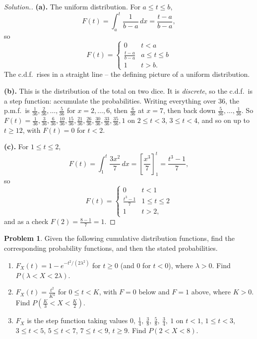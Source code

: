 \documentclass[12pt,a4paper]{report}
\theoremstyle{definition}
\theoremstyle{plain}
\theoremstyle{definition}
\newtheorem{problemx}{Problem}[section]
\newenvironment{problem}{\begin{problemx}}{\end{problemx}}
\newenvironment{solution}
  {\renewcommand{\qedsymbol}{}\begin{proof}[\textit{Solution}.]}
  {\end{proof}}
\begin{document}
\begin{solution}
\textbf{(a).} The uniform distribution. For $a\leq t\leq b$,
\[F(t) = \int_a^{t}\frac{1}{b-a}\,dx = \frac{t-a}{b-a},\]
so
\[F(t) = \begin{cases} 0 & t<a\\ \frac{t-a}{b-a} & a\leq t\leq b\\ 1 & t>b.\end{cases}\]
The c.d.f.\ rises in a straight line -- the defining picture of a uniform distribution.

\textbf{(b).} This is the distribution of the total on two dice. It is \emph{discrete}, so
the c.d.f.\ is a step function: accumulate the probabilities. Writing everything over 36,
the p.m.f.\ is $\tfrac{1}{36},\tfrac{2}{36},\ldots,\tfrac{5}{36}$ for $x = 2,\ldots,6$,
then $\tfrac{6}{36}$ at $x=7$, then back down $\tfrac{5}{36},\ldots,\tfrac{1}{36}$. So
$F(t) = \tfrac{1}{36},\tfrac{3}{36},\tfrac{6}{36},\tfrac{10}{36},\tfrac{15}{36},
\tfrac{21}{36},\tfrac{26}{36},\tfrac{30}{36},\tfrac{33}{36},\tfrac{35}{36},1$
on $2\leq t<3$, $3\leq t<4$, and so on up to $t\geq 12$, with $F(t) = 0$ for $t<2$.

\textbf{(c).} For $1\leq t\leq 2$,
\[F(t) = \int_1^{t}\frac{3x^{2}}{7}\,dx = \left[\frac{x^{3}}{7}\right]_1^{t}
 = \frac{t^{3}-1}{7},\]
so
\[F(t) = \begin{cases} 0 & t<1\\ \frac{t^{3}-1}{7} & 1\leq t\leq 2\\
1 & t>2,\end{cases}\]
and as a check $F(2) = \tfrac{8-1}{7} = 1$.
\end{solution}

\begin{problem}
Given the following cumulative distribution functions, find the corresponding probability
functions, and then the stated probabilities.
\begin{enumerate}
\item[(a).] $F_X(t) = 1-e^{-t^{2}/(2\lambda^{2})}$ for $t\geq 0$ (and 0 for $t<0$), where
$\lambda>0$. Find $P(\lambda<X<2\lambda)$.
\item[(b).] $F_X(t) = \frac{t^{2}}{K^{2}}$ for $0\leq t<K$, with $F=0$ below and $F=1$
above, where $K>0$. Find $P\left(\frac{K}{3}<X<\frac{K}{2}\right)$.
\item[(c).] $F_X$ is the step function taking values $0,\ \frac14,\ \frac38,\ \frac58,\
\frac34,\ 1$ on $t<1$, $1\leq t<3$, $3\leq t<5$, $5\leq t<7$, $7\leq t<9$, $t\geq 9$.
Find $P(2<X<8)$.
\end{enumerate}
\end{problem}
\end{document}

